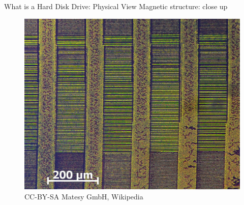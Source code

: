 \documentclass[12pt]{beamer}
\begin{document}
\begin{frame}[fragile]{What is a Hard Disk Drive: Physical View}
	Magnetic structure: close up
	\begin{figure}[p]
		\centering
		\includegraphics[width=0.7\linewidth]{img/floppy_physical.jpg}
		\caption{CC-BY-SA Matesy GmbH, Wikipedia}
	\end{figure}
\end{frame}
\end{document}
